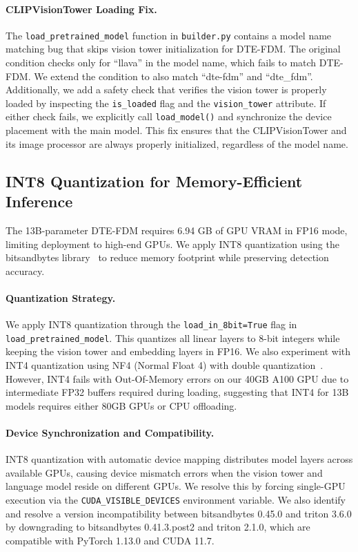 \paragraph{CLIPVisionTower Loading Fix.} The \texttt{load\_pretrained\_model} function in \texttt{builder.py} contains a model name matching bug that skips vision tower initialization for DTE-FDM. The original condition checks only for ``llava'' in the model name, which fails to match DTE-FDM. We extend the condition to also match ``dte-fdm'' and ``dte\_fdm''. Additionally, we add a safety check that verifies the vision tower is properly loaded by inspecting the \texttt{is\_loaded} flag and the \texttt{vision\_tower} attribute. If either check fails, we explicitly call \texttt{load\_model()} and synchronize the device placement with the main model. This fix ensures that the CLIPVisionTower and its image processor are always properly initialized, regardless of the model name.

\subsection{INT8 Quantization for Memory-Efficient Inference}

The 13B-parameter DTE-FDM requires 6.94 GB of GPU VRAM in FP16 mode, limiting deployment to high-end GPUs. We apply INT8 quantization using the bitsandbytes library~\citep{bitsandbytes} to reduce memory footprint while preserving detection accuracy.

\paragraph{Quantization Strategy.} We apply INT8 quantization through the \texttt{load\_in\_8bit=True} flag in \texttt{load\_pretrained\_model}. This quantizes all linear layers to 8-bit integers while keeping the vision tower and embedding layers in FP16. We also experiment with INT4 quantization using NF4 (Normal Float 4) with double quantization~\citep{nf4}. However, INT4 fails with Out-Of-Memory errors on our 40GB A100 GPU due to intermediate FP32 buffers required during loading, suggesting that INT4 for 13B models requires either 80GB GPUs or CPU offloading.

\paragraph{Device Synchronization and Compatibility.} INT8 quantization with automatic device mapping distributes model layers across available GPUs, causing device mismatch errors when the vision tower and language model reside on different GPUs. We resolve this by forcing single-GPU execution via the \texttt{CUDA\_VISIBLE\_DEVICES} environment variable. We also identify and resolve a version incompatibility between bitsandbytes 0.45.0 and triton 3.6.0 by downgrading to bitsandbytes 0.41.3.post2 and triton 2.1.0, which are compatible with PyTorch 1.13.0 and CUDA 11.7.

